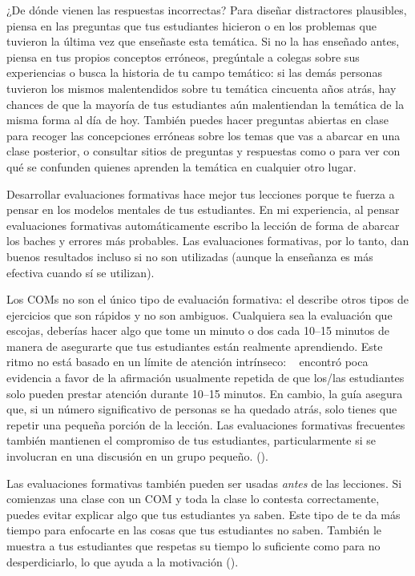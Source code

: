 \begin{aside}{¿De dónde vienen las respuestas incorrectas?}
 Para diseñar distractores plausibles,
piensa en las preguntas que tus estudiantes hicieron o en los problemas que tuvieron la última vez que enseñaste esta temática.
Si no la has enseñado antes,
piensa en tus propios conceptos erróneos,
pregúntale a colegas sobre sus experiencias
o busca la historia de tu campo temático:
si las demás personas tuvieron los mismos malentendidos sobre tu temática cincuenta años atrás,
hay chances de que la mayoría de tus estudiantes aún malentiendan la temática de la misma forma al día de hoy.
También puedes hacer preguntas abiertas en clase
para recoger las concepciones erróneas sobre los temas que vas a abarcar en una clase posterior,
o consultar sitios de preguntas y respuestas como 
  o 
  para ver con qué se confunden quienes aprenden la temática en cualquier otro lugar.
\end{aside}

Desarrollar evaluaciones formativas hace mejor tus lecciones
porque te fuerza a pensar en los modelos mentales de tus estudiantes.
En mi experiencia,
al pensar evaluaciones formativas automáticamente escribo la lección de forma de abarcar los baches y errores más probables.
Las evaluaciones formativas, por lo tanto, dan buenos resultados incluso si no son utilizadas
(aunque la enseñanza es más efectiva cuando sí se utilizan).

Los COMs no son el único tipo de evaluación formativa:
el  describe otros tipos de ejercicios que son rápidos y no son ambiguos.
Cualquiera sea la evaluación que escojas,
deberías hacer algo que tome un minuto o dos cada 10--15 minutos
de manera de asegurarte que tus estudiantes están realmente aprendiendo.
Este ritmo no está basado en un límite de atención intrínseco: ~\cite{Wils2007}
encontró poca evidencia a favor de la afirmación usualmente repetida de que
los/las estudiantes solo pueden prestar atención durante 10--15 minutos.
En cambio,
la guía asegura que, si un número significativo de personas se ha quedado atrás,
solo tienes que repetir una pequeña porción de la lección.
Las evaluaciones formativas frecuentes también mantienen el compromiso de tus estudiantes, 
particularmente si se involucran en una discusión en un grupo pequeño.
().

Las evaluaciones formativas también pueden ser usadas \emph{antes} de las lecciones.
Si comienzas una clase con un COM y toda la clase lo contesta correctamente,
puedes evitar explicar algo que tus estudiantes ya saben.
Este tipo de 
te da más tiempo para enfocarte en las cosas que tus estudiantes no saben.
También le muestra a tus estudiantes que respetas su tiempo lo suficiente como para no desperdiciarlo,
lo que ayuda a la motivación ().

